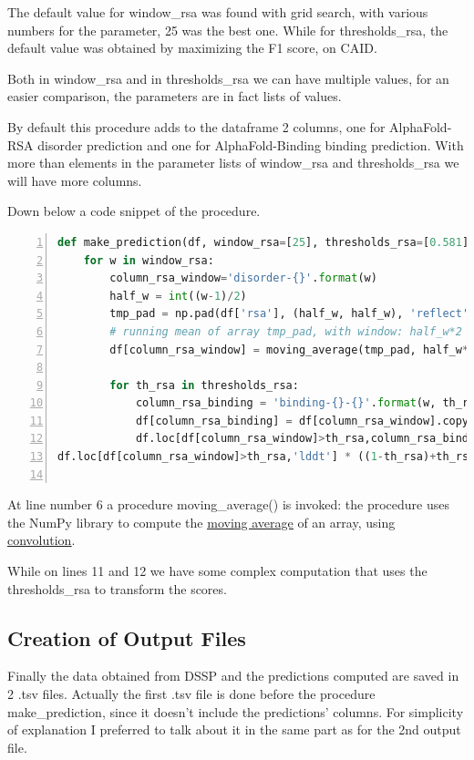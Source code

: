 The default value for window\_rsa was found with grid search, with various numbers for the parameter, 25 was the best one. While for thresholds\_rsa, the default value was obtained by maximizing the F1 score, on CAID.

Both in window\_rsa and in thresholds\_rsa we can have multiple values, for an easier comparison, the parameters are in fact lists of values.

By default this procedure adds to the dataframe 2 columns, one for AlphaFold-RSA disorder prediction and one for AlphaFold-Binding binding prediction. With more than elements in the parameter lists of window\_rsa and thresholds\_rsa we will have more columns.

Down below a code snippet of the procedure.

\begin{lstlisting}[language=Python, caption=Procedure make\_prediction(), numbers=left, label={code:makepred}]
def make_prediction(df, window_rsa=[25], thresholds_rsa=[0.581]):
    for w in window_rsa:
        column_rsa_window='disorder-{}'.format(w)
        half_w = int((w-1)/2)
        tmp_pad = np.pad(df['rsa'], (half_w, half_w), 'reflect')
        # running mean of array tmp_pad, with window: half_w*2 +1
        df[column_rsa_window] = moving_average(tmp_pad, half_w*2 +1)

        for th_rsa in thresholds_rsa:
            column_rsa_binding = 'binding-{}-{}'.format(w, th_rsa)
            df[column_rsa_binding] = df[column_rsa_window].copy()
            df.loc[df[column_rsa_window]>th_rsa,column_rsa_binding] =
df.loc[df[column_rsa_window]>th_rsa,'lddt'] * ((1-th_rsa)+th_rsa)
        
\end{lstlisting}

At line number 6 a procedure moving\_average() is invoked: the procedure uses the NumPy library to compute the \href{https://en.wikipedia.org/wiki/Moving_average}{\underline{moving average}} of an array, using \href{https://en.wikipedia.org/wiki/Convolution}{\underline{convolution}}. 

While on lines 11 and 12 we have some complex computation that uses the thresholds\_rsa to transform the scores.

\subsection{Creation of Output Files}

Finally the data obtained from DSSP and the predictions computed are saved in 2 .tsv files. Actually the first .tsv file is done before the procedure make\_prediction, since it doesn't include the predictions' columns. For simplicity of explanation I preferred to talk about it in the same part as for the 2nd output file.

